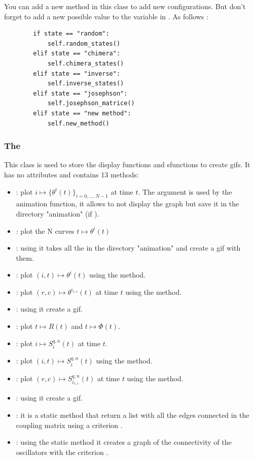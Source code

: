 \documentclass[1pt, a4paper]{article}
\begin{document}
You can add a new method in this class to add new configurations. But don't forget to add a new possible value to the  variable in . As follows :
\begin{verbatim}
        if state == "random":
            self.random_states()
        elif state == "chimera":
            self.chimera_states()
        elif state == "inverse":
            self.inverse_states()
        elif state == "josephson":
            self.josephson_matrice()
        elif state == "new method":
            self.new_method()
\end{verbatim}
\subsubsection{The }
\label{subsubs:graph}
This class is used to store the display functions and sfunctions to create gifs. It has no attributes and contains 13 methods:
\begin{itemize}[itemsep=0pt]
    \item {} : plot $i\longmapsto\{\theta^i(t)\}_{i=0,...,N-1}$ at time $t$. The argument  is used by the animation function, it allows to not display the graph but save it in the directory "animation" (if ).
    \item {} : plot the N curves $t\longmapsto\theta^i(t)$
    \item {} : using  it takes all the  in the directory "animation" and create a gif with them.
    \item {} : plot $(i,t)\longmapsto \theta^i (t)$ using the  method. 
    \item {} : plot $(r,c)\longmapsto \theta^{i_{r,c}} (t)$ at time $t$ using the  method.
    \item {} : using  it create a gif.
    \item {} : plot $t \longmapsto R(t)$ and $t \longmapsto \Phi(t)$.
    \item {} : plot $i \longmapsto S_i^{q, n}(t)$ at time $t$.
    \item {} : plot $(i,t) \longmapsto S_i^{q, n}(t)$ using the  method.
    \item {} : plot $(r,c) \longmapsto S_{i_{r,c}}^{q, n}(t)$ at time $t$ using the  method.
    \item {} : using  it create a gif.
    \item {} : it is a static method that return a list with all the edges connected in the coupling matrix  using a criterion .
    \item {} : using the static method  it creates a graph of the connectivity of the oscillators with the criterion .
\end{itemize}
\end{document}
